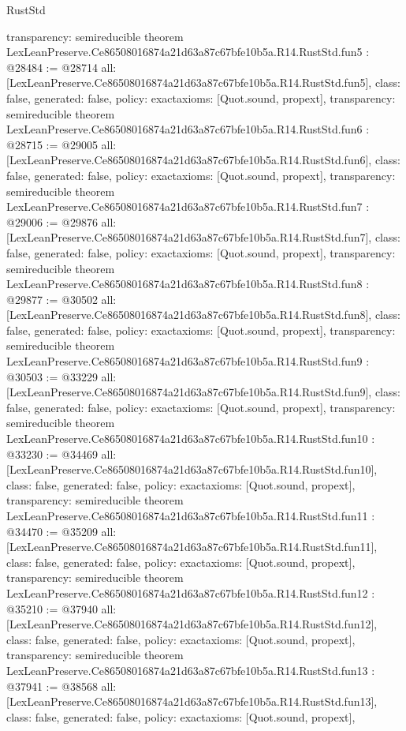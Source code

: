 \begin{lexlean}{RustStd}
\begin{coremodule}
{  transparency: semireducible
}
theorem LexLeanPreserve.Ce86508016874a21d63a87c67bfe10b5a.R14.RustStd.fun5 : @28484 := @28714 {
  all: [LexLeanPreserve.Ce86508016874a21d63a87c67bfe10b5a.R14.RustStd.fun5],
  class: false,
  generated: false,
  policy: exact{axioms: [Quot.sound, propext]},
  transparency: semireducible
}
theorem LexLeanPreserve.Ce86508016874a21d63a87c67bfe10b5a.R14.RustStd.fun6 : @28715 := @29005 {
  all: [LexLeanPreserve.Ce86508016874a21d63a87c67bfe10b5a.R14.RustStd.fun6],
  class: false,
  generated: false,
  policy: exact{axioms: [Quot.sound, propext]},
  transparency: semireducible
}
theorem LexLeanPreserve.Ce86508016874a21d63a87c67bfe10b5a.R14.RustStd.fun7 : @29006 := @29876 {
  all: [LexLeanPreserve.Ce86508016874a21d63a87c67bfe10b5a.R14.RustStd.fun7],
  class: false,
  generated: false,
  policy: exact{axioms: [Quot.sound, propext]},
  transparency: semireducible
}
theorem LexLeanPreserve.Ce86508016874a21d63a87c67bfe10b5a.R14.RustStd.fun8 : @29877 := @30502 {
  all: [LexLeanPreserve.Ce86508016874a21d63a87c67bfe10b5a.R14.RustStd.fun8],
  class: false,
  generated: false,
  policy: exact{axioms: [Quot.sound, propext]},
  transparency: semireducible
}
theorem LexLeanPreserve.Ce86508016874a21d63a87c67bfe10b5a.R14.RustStd.fun9 : @30503 := @33229 {
  all: [LexLeanPreserve.Ce86508016874a21d63a87c67bfe10b5a.R14.RustStd.fun9],
  class: false,
  generated: false,
  policy: exact{axioms: [Quot.sound, propext]},
  transparency: semireducible
}
theorem LexLeanPreserve.Ce86508016874a21d63a87c67bfe10b5a.R14.RustStd.fun10 : @33230 := @34469 {
  all: [LexLeanPreserve.Ce86508016874a21d63a87c67bfe10b5a.R14.RustStd.fun10],
  class: false,
  generated: false,
  policy: exact{axioms: [Quot.sound, propext]},
  transparency: semireducible
}
theorem LexLeanPreserve.Ce86508016874a21d63a87c67bfe10b5a.R14.RustStd.fun11 : @34470 := @35209 {
  all: [LexLeanPreserve.Ce86508016874a21d63a87c67bfe10b5a.R14.RustStd.fun11],
  class: false,
  generated: false,
  policy: exact{axioms: [Quot.sound, propext]},
  transparency: semireducible
}
theorem LexLeanPreserve.Ce86508016874a21d63a87c67bfe10b5a.R14.RustStd.fun12 : @35210 := @37940 {
  all: [LexLeanPreserve.Ce86508016874a21d63a87c67bfe10b5a.R14.RustStd.fun12],
  class: false,
  generated: false,
  policy: exact{axioms: [Quot.sound, propext]},
  transparency: semireducible
}
theorem LexLeanPreserve.Ce86508016874a21d63a87c67bfe10b5a.R14.RustStd.fun13 : @37941 := @38568 {
  all: [LexLeanPreserve.Ce86508016874a21d63a87c67bfe10b5a.R14.RustStd.fun13],
  class: false,
  generated: false,
  policy: exact{axioms: [Quot.sound, propext]},
}
\end{coremodule}
\end{lexlean}
